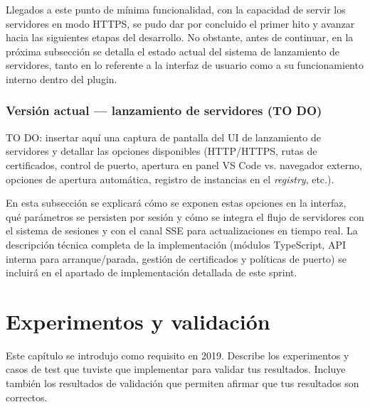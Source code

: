 \documentclass[a4paper, 12pt]{book}
\begin{document}
Llegados a este punto de mínima funcionalidad, con la capacidad de servir los servidores en modo HTTPS, se pudo dar por concluido el primer hito y avanzar hacia las siguientes etapas del desarrollo. No obstante, antes de continuar, en la próxima subsección se detalla el estado actual del sistema de lanzamiento de servidores, tanto en lo referente a la interfaz de usuario como a su funcionamiento interno dentro del plugin.

\subsection{Versión actual — lanzamiento de servidores (TO DO)}
TO DO: insertar aquí una captura de pantalla del UI de lanzamiento de servidores y detallar las opciones disponibles (HTTP/HTTPS, rutas de certificados, control de puerto, apertura en panel VS Code vs. navegador externo, opciones de apertura automática, registro de instancias en el \emph{registry}, etc.).  

En esta subsección se explicará cómo se exponen estas opciones en la interfaz, qué parámetros se persisten por sesión y cómo se integra el flujo de servidores con el sistema de sesiones y con el canal SSE para actualizaciones en tiempo real. La descripción técnica completa de la implementación (módulos TypeScript, API interna para arranque/parada, gestión de certificados y políticas de puerto) se incluirá en el apartado de implementación detallada de este sprint.


%

\cleardoublepage
\chapter{Experimentos y validación}
\label{chap:experimentos}

Este capítulo se introdujo como requisito en 2019. 
Describe los experimentos y casos de test que tuviste que implementar para validar tus resultados. 
Incluye también los resultados de validación que permiten afirmar que tus resultados son correctos. 


\end{document}

